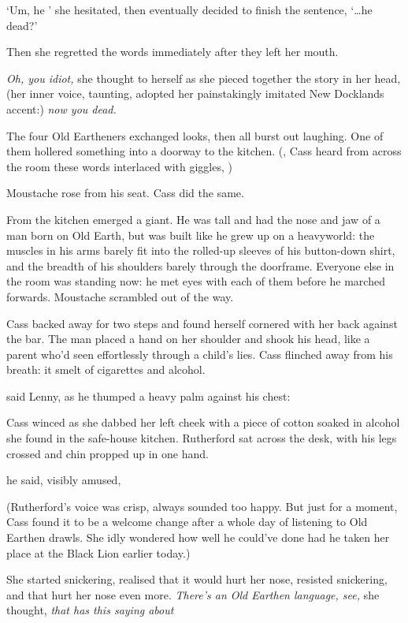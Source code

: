 `Um, he \textemdash{}' she hesitated, then eventually decided to
finish the sentence, `\ldots he dead?'

Then she regretted the words immediately after they left her mouth.

\textit{Oh, you idiot,} she thought to herself as she pieced together
the story in her head, (her inner voice, taunting, adopted her
painstakingly imitated New Docklands accent:) \textit{now \emph{you}
  dead.}

The four Old Eartheners exchanged looks, then all burst out
laughing. One of them hollered something into a doorway to the
kitchen. (, Cass heard
from across the room these words interlaced with giggles, )

Moustache rose from his seat. Cass did the same.

From the kitchen emerged a giant. He was tall and had the nose and jaw
of a man born on Old Earth, but was built like he grew up on a
heavyworld: the muscles in his arms barely fit into the rolled-up
sleeves of his button-down shirt, and the breadth of his shoulders
barely through the doorframe. Everyone else in the room was standing
now: he met eyes with each of them before he marched
forwards. Moustache scrambled out of the way.

Cass backed away for two steps and found herself cornered with her
back against the bar. The man placed a hand on her shoulder and shook
his head, like a parent who'd seen effortlessly through a child's
lies. Cass flinched away from his breath: it smelt of cigarettes and
alcohol.

 said Lenny, as he thumped a heavy palm
against his chest: 

\shorthline
Cass winced as she dabbed her left cheek with a piece of cotton soaked
in alcohol she found in the safe-house kitchen. Rutherford sat across
the desk, with his legs crossed and chin propped up in one hand.

 he said, visibly amused, 

(Rutherford's voice was crisp, always sounded too happy. But just for
a moment, Cass found it to be a welcome change after a whole day of
listening to Old Earthen drawls. She idly wondered how well he could've
done had he taken her place at the Black Lion earlier today.)

She started snickering, realised that it would hurt her nose, resisted
snickering, and that hurt her nose even more. \textit{There's an Old
  Earthen language, see,} she thought, \textit{that has this saying
  about \textemdash{}}

